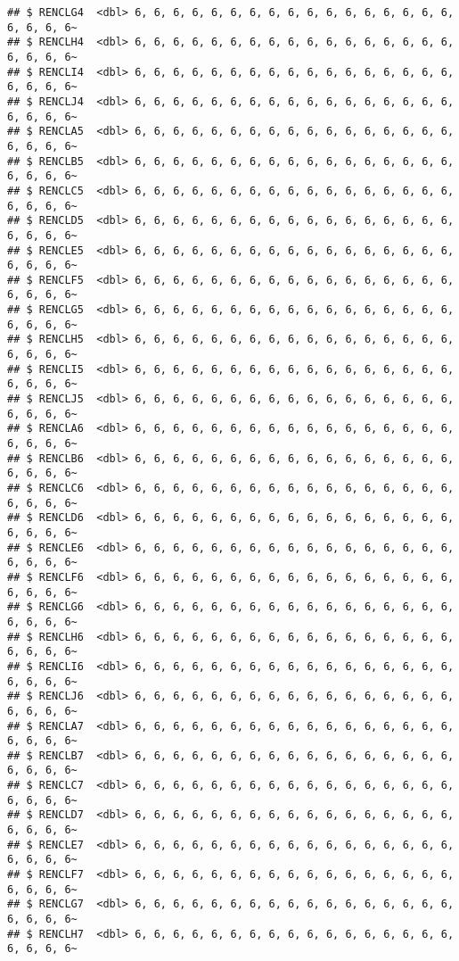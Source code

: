 \documentclass[
]{article}
\begin{document}
\begin{verbatim}
## $ RENCLG4  <dbl> 6, 6, 6, 6, 6, 6, 6, 6, 6, 6, 6, 6, 6, 6, 6, 6, 6, 6, 6, 6, 6~
## $ RENCLH4  <dbl> 6, 6, 6, 6, 6, 6, 6, 6, 6, 6, 6, 6, 6, 6, 6, 6, 6, 6, 6, 6, 6~
## $ RENCLI4  <dbl> 6, 6, 6, 6, 6, 6, 6, 6, 6, 6, 6, 6, 6, 6, 6, 6, 6, 6, 6, 6, 6~
## $ RENCLJ4  <dbl> 6, 6, 6, 6, 6, 6, 6, 6, 6, 6, 6, 6, 6, 6, 6, 6, 6, 6, 6, 6, 6~
## $ RENCLA5  <dbl> 6, 6, 6, 6, 6, 6, 6, 6, 6, 6, 6, 6, 6, 6, 6, 6, 6, 6, 6, 6, 6~
## $ RENCLB5  <dbl> 6, 6, 6, 6, 6, 6, 6, 6, 6, 6, 6, 6, 6, 6, 6, 6, 6, 6, 6, 6, 6~
## $ RENCLC5  <dbl> 6, 6, 6, 6, 6, 6, 6, 6, 6, 6, 6, 6, 6, 6, 6, 6, 6, 6, 6, 6, 6~
## $ RENCLD5  <dbl> 6, 6, 6, 6, 6, 6, 6, 6, 6, 6, 6, 6, 6, 6, 6, 6, 6, 6, 6, 6, 6~
## $ RENCLE5  <dbl> 6, 6, 6, 6, 6, 6, 6, 6, 6, 6, 6, 6, 6, 6, 6, 6, 6, 6, 6, 6, 6~
## $ RENCLF5  <dbl> 6, 6, 6, 6, 6, 6, 6, 6, 6, 6, 6, 6, 6, 6, 6, 6, 6, 6, 6, 6, 6~
## $ RENCLG5  <dbl> 6, 6, 6, 6, 6, 6, 6, 6, 6, 6, 6, 6, 6, 6, 6, 6, 6, 6, 6, 6, 6~
## $ RENCLH5  <dbl> 6, 6, 6, 6, 6, 6, 6, 6, 6, 6, 6, 6, 6, 6, 6, 6, 6, 6, 6, 6, 6~
## $ RENCLI5  <dbl> 6, 6, 6, 6, 6, 6, 6, 6, 6, 6, 6, 6, 6, 6, 6, 6, 6, 6, 6, 6, 6~
## $ RENCLJ5  <dbl> 6, 6, 6, 6, 6, 6, 6, 6, 6, 6, 6, 6, 6, 6, 6, 6, 6, 6, 6, 6, 6~
## $ RENCLA6  <dbl> 6, 6, 6, 6, 6, 6, 6, 6, 6, 6, 6, 6, 6, 6, 6, 6, 6, 6, 6, 6, 6~
## $ RENCLB6  <dbl> 6, 6, 6, 6, 6, 6, 6, 6, 6, 6, 6, 6, 6, 6, 6, 6, 6, 6, 6, 6, 6~
## $ RENCLC6  <dbl> 6, 6, 6, 6, 6, 6, 6, 6, 6, 6, 6, 6, 6, 6, 6, 6, 6, 6, 6, 6, 6~
## $ RENCLD6  <dbl> 6, 6, 6, 6, 6, 6, 6, 6, 6, 6, 6, 6, 6, 6, 6, 6, 6, 6, 6, 6, 6~
## $ RENCLE6  <dbl> 6, 6, 6, 6, 6, 6, 6, 6, 6, 6, 6, 6, 6, 6, 6, 6, 6, 6, 6, 6, 6~
## $ RENCLF6  <dbl> 6, 6, 6, 6, 6, 6, 6, 6, 6, 6, 6, 6, 6, 6, 6, 6, 6, 6, 6, 6, 6~
## $ RENCLG6  <dbl> 6, 6, 6, 6, 6, 6, 6, 6, 6, 6, 6, 6, 6, 6, 6, 6, 6, 6, 6, 6, 6~
## $ RENCLH6  <dbl> 6, 6, 6, 6, 6, 6, 6, 6, 6, 6, 6, 6, 6, 6, 6, 6, 6, 6, 6, 6, 6~
## $ RENCLI6  <dbl> 6, 6, 6, 6, 6, 6, 6, 6, 6, 6, 6, 6, 6, 6, 6, 6, 6, 6, 6, 6, 6~
## $ RENCLJ6  <dbl> 6, 6, 6, 6, 6, 6, 6, 6, 6, 6, 6, 6, 6, 6, 6, 6, 6, 6, 6, 6, 6~
## $ RENCLA7  <dbl> 6, 6, 6, 6, 6, 6, 6, 6, 6, 6, 6, 6, 6, 6, 6, 6, 6, 6, 6, 6, 6~
## $ RENCLB7  <dbl> 6, 6, 6, 6, 6, 6, 6, 6, 6, 6, 6, 6, 6, 6, 6, 6, 6, 6, 6, 6, 6~
## $ RENCLC7  <dbl> 6, 6, 6, 6, 6, 6, 6, 6, 6, 6, 6, 6, 6, 6, 6, 6, 6, 6, 6, 6, 6~
## $ RENCLD7  <dbl> 6, 6, 6, 6, 6, 6, 6, 6, 6, 6, 6, 6, 6, 6, 6, 6, 6, 6, 6, 6, 6~
## $ RENCLE7  <dbl> 6, 6, 6, 6, 6, 6, 6, 6, 6, 6, 6, 6, 6, 6, 6, 6, 6, 6, 6, 6, 6~
## $ RENCLF7  <dbl> 6, 6, 6, 6, 6, 6, 6, 6, 6, 6, 6, 6, 6, 6, 6, 6, 6, 6, 6, 6, 6~
## $ RENCLG7  <dbl> 6, 6, 6, 6, 6, 6, 6, 6, 6, 6, 6, 6, 6, 6, 6, 6, 6, 6, 6, 6, 6~
## $ RENCLH7  <dbl> 6, 6, 6, 6, 6, 6, 6, 6, 6, 6, 6, 6, 6, 6, 6, 6, 6, 6, 6, 6, 6~

\end{verbatim}
\end{document}
